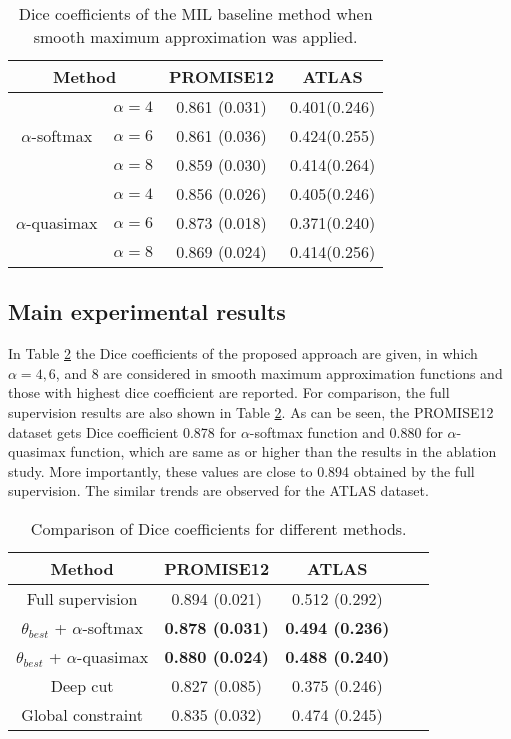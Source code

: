 \documentclass[runningheads]{llncs}
\begin{document}
\renewcommand\arraystretch{1.3}
\begin{table}
\caption{Dice coefficients of the MIL baseline method when smooth maximum approximation was applied. }
\centering
\label{table}
\setlength{\tabcolsep}{5pt}
\begin{tabular}{cccc}
\hline
\hline
\multicolumn{2}{c}{Method} & PROMISE12 & ATLAS \\
\hline
\multirow{3}{*}{$\alpha$-softmax} & $\alpha = 4$ & 0.861 (0.031) & 0.401(0.246) \\
& $\alpha = 6$ & 0.861 (0.036) & 0.424(0.255) \\
& $\alpha = 8$ & 0.859 (0.030) & 0.414(0.264) \\
\hline
\multirow{3}{*}{$\alpha$-quasimax} & $\alpha = 4$ & 0.856 (0.026) & 0.405(0.246) \\
& $\alpha = 6$ & 0.873 (0.018) & 0.371(0.240) \\
& $\alpha = 8$ & 0.869 (0.024) & 0.414(0.256) \\
\hline
\hline
\end{tabular}
\label{table:ablation_approximation}
\end{table}



\subsection{Main experimental results}
In Table \ref{table:main_results} the Dice coefficients of the proposed approach are given, in which $\alpha=4,6$, and 8 are considered in smooth maximum approximation functions and those with highest dice coefficient are reported. For comparison, the full supervision results are also shown in Table \ref{table:main_results}. As can be seen, the PROMISE12 dataset gets Dice coefficient 0.878 for $\alpha$-softmax function and 0.880 for $\alpha$-quasimax function, which are same as or higher than the results in the ablation study. More importantly, these values are close to 0.894 obtained by the full supervision. The similar trends are observed for the ATLAS dataset.


\renewcommand\arraystretch{1.3}
\begin{table}
\caption{Comparison of Dice coefficients for different methods.}
\centering
\label{table}
\setlength{\tabcolsep}{5pt}
\begin{tabular}{ccccc}
\hline
\hline
Method & PROMISE12 & ATLAS \\
\hline
Full supervision & 0.894 (0.021) & 0.512 (0.292) \\
$\theta_{best}$ + $\alpha$-softmax & \textbf{0.878 (0.031)} & \textbf{0.494 (0.236)} \\
$\theta_{best}$ + $\alpha$-quasimax & \textbf{0.880 (0.024)} & \textbf{0.488 (0.240)} \\
Deep cut \cite{rajchl2016deepcut} & 0.827 (0.085) & 0.375 (0.246) \\
Global constraint \cite{kervadec2020bounding} & 0.835 (0.032) & 0.474 (0.245) \\
\hline
\hline
\end{tabular}
\label{table:main_results}
\end{table}
\end{document}
